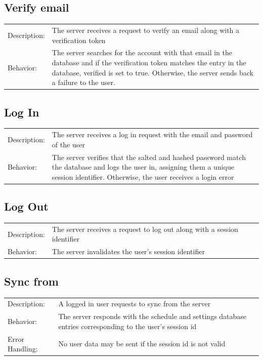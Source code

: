 \documentclass{scrreprt}
\begin{document}
\subsection{Verify email}
\begin{center}
\begin{tabular}{ p{2cm} p{13cm} }
Description: & The server receives a request to verify an email along with a verification token\\
Behavior: & The server searches for the account with that email in the database and if the verification token matches
the entry in the database, verified is set to true.  Otherwise, the server sends back a failure to the user.\\
\end{tabular}
\end{center}

\subsection{Log In}
\begin{center}
\begin{tabular}{ p{2cm} p{13cm} }
Description: & The server receives a log in request with the email and password of the user\\
Behavior: & The server verifies that the salted and hashed password match the database and logs the user in,
assigning them a unique session identifier.  Otherwise, the user receives a login error\\
\end{tabular}
\end{center}

\subsection{Log Out}
\begin{center}
\begin{tabular}{ p{2cm} p{13cm} }
Description: & The server receives a request to log out along with a session identifier\\
Behavior: & The server invalidates the user's session identifier\\
\end{tabular}
\end{center}

\subsection{Sync from}
\begin{center}
\begin{tabular}{ p{2cm} p{13cm} }
Description: & A logged in user requests to sync from the server\\
Behavior: & The server responds with the schedule and settings database entries corresponding to the user's session id\\
Error Handling: & No user data may be sent if the session id is not valid\\
\end{tabular}
\end{center}
\end{document}
